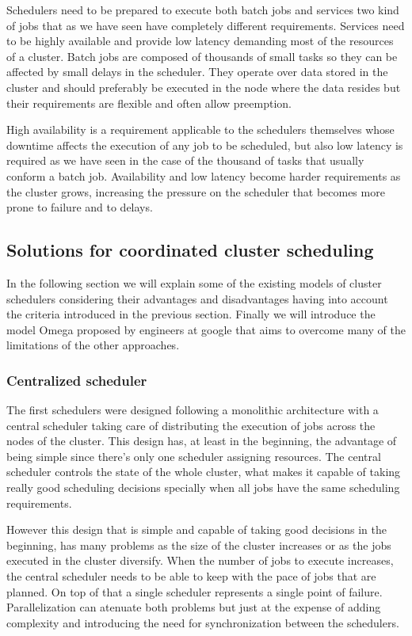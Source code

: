 \documentclass{svjour3}                     %
\begin{document}
Schedulers need to be prepared to execute both batch jobs and services
two kind of jobs that as we have seen have completely different
requirements. Services need to be highly
available and provide low latency demanding most of the resources of a
cluster. Batch jobs are composed of thousands of small tasks so they
can be affected by small delays in the scheduler. They operate over
data stored in the cluster and should preferably be executed in the
node where the data resides but their requirements are flexible and
often allow preemption.

High availability is a requirement applicable to the schedulers
themselves whose downtime affects the execution of any job to be
scheduled, but also low latency is required as we have seen in the
case of the thousand of tasks that usually conform a batch
job. Availability and low latency become harder requirements as the
cluster grows, increasing the pressure on the scheduler that becomes
more prone to failure and to delays.

\subsection{Solutions for coordinated cluster scheduling}

In the following section we will explain some of the existing models
of cluster schedulers considering their advantages and disadvantages
having into account the criteria introduced in the previous
section. Finally we will introduce the model Omega \cite{41684}
proposed by engineers at google that aims to overcome many of the
limitations of the other approaches.

\subsubsection{Centralized scheduler}

The first schedulers were designed following a monolithic architecture
with a central scheduler taking care of distributing the execution
of jobs across the nodes of the cluster. This design has, at least in
the beginning, the advantage of being simple since there's only one
scheduler assigning resources. The central scheduler controls the
state of the whole cluster, what makes it capable of taking really
good scheduling decisions specially when all jobs have the same
scheduling requirements. 

However this design that is simple and capable of taking good
decisions in the beginning, has many problems as the size of the
cluster increases or as the jobs executed in the cluster
diversify. When the number of jobs to execute increases, the central
scheduler needs to be able to keep with the pace of jobs that are
planned. On top of that a single scheduler represents a single point
of failure. Parallelization can atenuate both problems but just at the
expense of adding complexity and introducing the need for synchronization
between the schedulers.
\end{document}
